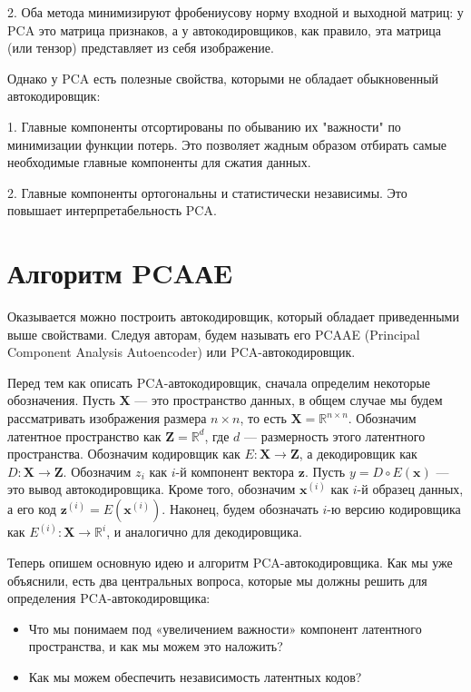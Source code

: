 2. Оба метода минимизируют фробениусову норму входной и выходной матриц: у PCA это матрица признаков, а у автокодировщиков, как правило, эта матрица (или тензор) представляет из себя изображение.

Однако у PCA есть полезные свойства, которыми не обладает обыкновенный автокодировщик: 

1. Главные компоненты отсортированы по обыванию их "важности" по минимизации функции потерь. Это позволяет жадным образом отбирать самые необходимые главные компоненты для сжатия данных.

2. Главные компоненты ортогональны и статистически независимы. Это повышает интерпретабельность PCA.



\section{Алгоритм PCAАE}

Оказывается можно построить автокодировщик, который обладает приведенными выше свойствами. Следуя авторам, будем называть его PCAAE (Principal Component Analysis Autoencoder) или PCA-автокодировщик.

Перед тем как описать PCA-автокодировщик, сначала определим некоторые обозначения. Пусть \( \mathbf{X} \) — это пространство данных, в общем случае мы будем рассматривать изображения размера \( n \times n \), то есть \( \mathbf{X} = \mathbb{R}^{n \times n} \). Обозначим латентное пространство как \( \mathbf{Z} = \mathbb{R}^d \), где \( d \) — размерность этого латентного пространства. Обозначим кодировщик как \( E: \mathbf{X} \to \mathbf{Z} \), а декодировщик как \( D: \mathbf{X} \to \mathbf{Z} \). Обозначим \( z_i \) как \( i \)-й компонент вектора \( \mathbf{z} \). Пусть \( y = D \circ E(\mathbf{x}) \) — это вывод автокодировщика. Кроме того, обозначим \( \mathbf{x}^{(i)} \) как \( i \)-й образец данных, а его код \( \mathbf{z}^{(i)} = E(\mathbf{x}^{(i)}) \). Наконец, будем обозначать \( i \)-ю версию кодировщика как \( E^{(i)}: \mathbf{X} \to \mathbb{R}^i \), и аналогично для декодировщика.

Теперь опишем основную идею и алгоритм PCA-автокодировщика. Как мы уже объяснили, есть два центральных вопроса, которые мы должны решить для определения PCA-автокодировщика:
\begin{itemize}
    \item Что мы понимаем под «увеличением важности» компонент латентного пространства, и как мы можем это наложить?
    \item Как мы можем обеспечить независимость латентных кодов?
\end{itemize}

